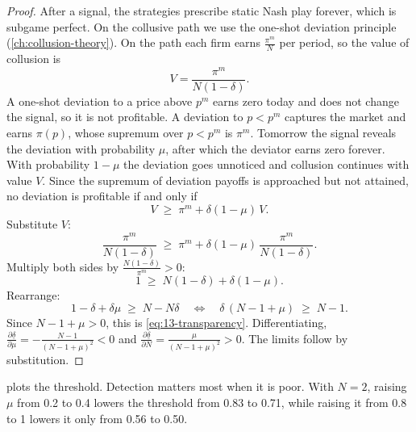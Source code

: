 \begin{proof}
After a signal, the strategies prescribe static Nash play forever, which is subgame perfect. On the collusive
path we use the one-shot deviation principle (\cref{ch:collusion-theory}). On the path each firm earns
$\frac{\pi^m}{N}$ per period, so the value of collusion is
\begin{equation*}
  V = \frac{\pi^m}{N(1-\delta)} .
\end{equation*}
A one-shot deviation to a price above $p^m$ earns zero today and does not change the signal, so it is not
profitable. A deviation to $p < p^m$ captures the market and earns $\pi(p)$, whose supremum over $p < p^m$ is
$\pi^m$. Tomorrow the signal reveals the deviation with probability $\mu$, after which the deviator earns zero
forever. With probability $1 - \mu$ the deviation goes unnoticed and collusion continues with value $V$. Since the
supremum of deviation payoffs is approached but not attained, no deviation is profitable if and only if
\begin{equation*}
  V \;\ge\; \pi^m + \delta(1 - \mu)\,V .
\end{equation*}
Substitute $V$:
\begin{equation*}
  \frac{\pi^m}{N(1-\delta)} \;\ge\; \pi^m + \delta(1-\mu)\,\frac{\pi^m}{N(1-\delta)} .
\end{equation*}
Multiply both sides by $\frac{N(1-\delta)}{\pi^m} > 0$:
\begin{equation*}
  1 \;\ge\; N(1-\delta) + \delta(1-\mu) .
\end{equation*}
Rearrange:
\begin{equation*}
  1 - \delta + \delta\mu \;\ge\; N - N\delta
  \quad\Longleftrightarrow\quad
  \delta\,(N - 1 + \mu) \;\ge\; N - 1 .
\end{equation*}
Since $N - 1 + \mu > 0$, this is \eqref{eq:13-transparency}. Differentiating,
$\frac{\partial\underline\delta}{\partial\mu} = -\frac{N-1}{(N-1+\mu)^2} < 0$ and
$\frac{\partial\underline\delta}{\partial N} = \frac{\mu}{(N-1+\mu)^2} > 0$. The limits follow by substitution.
\end{proof}

 plots the threshold. Detection matters most when it is poor. With $N = 2$, raising
$\mu$ from 0.2 to 0.4 lowers the threshold from 0.83 to 0.71, while raising it from 0.8 to 1 lowers it only from
0.56 to 0.50.

